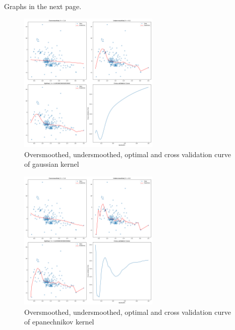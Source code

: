 Graphs in the next page.
\begin{figure}[H]
	\centering
	\includegraphics[width=0.6\textwidth]{../images/4/gaussian_kernel_regression.png}
	\caption{Oversmoothed, undersmoothed, optimal and cross validation curve of gaussian kernel}
\end{figure}

\begin{figure}[H]
	\centering
	\includegraphics[width=0.6\textwidth]{../images/4/epanechnikov_kernel_regression.png}
	\caption{Oversmoothed, undersmoothed, optimal and cross validation curve of epanechnikov kernel}
\end{figure}






